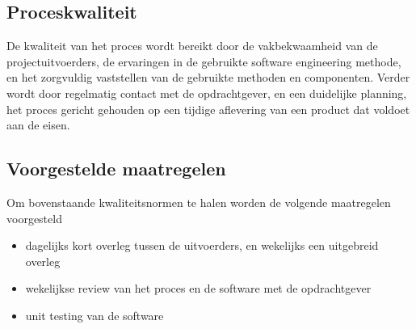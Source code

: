 
\subsection{Proceskwaliteit}
De kwaliteit van het proces wordt bereikt door de vakbekwaamheid van de projectuitvoerders,
de ervaringen in de gebruikte software engineering methode,
en het zorgvuldig vaststellen van de gebruikte methoden en componenten.
Verder wordt door regelmatig contact met de opdrachtgever, en een duidelijke planning, 
het proces gericht gehouden op een tijdige aflevering van een product dat voldoet aan de eisen.

\subsection{Voorgestelde maatregelen}
Om bovenstaande kwaliteitsnormen te halen worden de volgende maatregelen voorgesteld
\begin{itemize}
\item dagelijks kort overleg tussen de uitvoerders, en wekelijks een uitgebreid overleg
\item wekelijkse review van het proces en de software met de opdrachtgever
\item unit testing van de software
\end{itemize}



